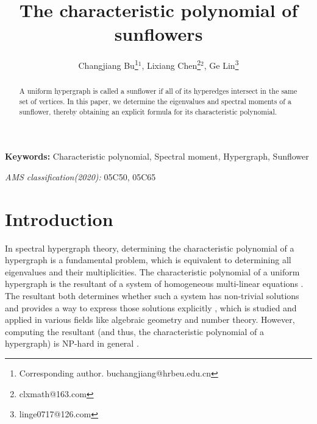 \documentclass{article}
\title{\textbf{The characteristic polynomial of sunflowers}}
\author{Changjiang Bu\thanks{Corresponding author. buchangjiang@hrbeu.edu.cn}$^{1}$,  Lixiang Chen\thanks{clxmath@163.com}$^{2}$,  Ge Lin\thanks{linge0717@126.com}}
\affil[1]{School of Mathematical Sciences, Harbin Engineering University, Harbin, PR China }
\affil[2]{Center for Combinatorics, LPMC, Nankai University, Tianjin, PR China}
\date{}
\begin{document}
\maketitle

\begin{abstract}
A uniform hypergraph is called a sunflower if all of its hyperedges intersect in the same set of vertices.
In this paper, we determine the eigenvalues and spectral moments of a sunflower, thereby obtaining an explicit formula for its characteristic polynomial.
\end{abstract}

\noindent\textbf{Keywords:} Characteristic polynomial, Spectral moment, Hypergraph, Sunflower

\noindent\emph{AMS classification(2020):} 05C50, 05C65



\section{Introduction}

In spectral hypergraph theory, determining the characteristic polynomial of a hypergraph is a fundamental problem,
which is equivalent to determining all eigenvalues and their multiplicities.
The characteristic polynomial of a uniform hypergraph is the resultant of a system of homogeneous multi-linear equations \cite{qi2005eigenvalues}.
The resultant both determines whether such a system has non-trivial solutions and provides a way to express those solutions explicitly \cite{cox2005using},
which is studied and applied in various fields like algebraic geometry and number theory.
However, computing the resultant (and thus, the characteristic polynomial of a hypergraph) is NP-hard in general \cite{hillar2013most}.
\end{document}

